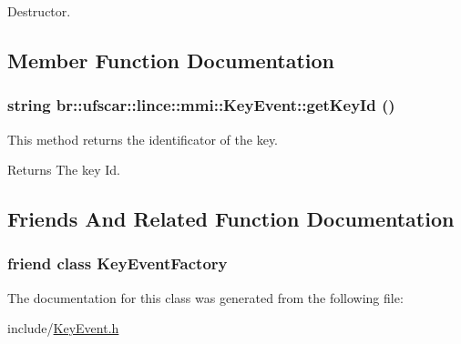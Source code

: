 Destructor. 



\subsection{Member Function Documentation}
\hypertarget{classbr_1_1ufscar_1_1lince_1_1mmi_1_1KeyEvent_a4277d9938693821db5db50942f98fcb5}{
\subsubsection[{getKeyId}]{\setlength{\rightskip}{0pt plus 5cm}string br::ufscar::lince::mmi::KeyEvent::getKeyId ()}}
\label{classbr_1_1ufscar_1_1lince_1_1mmi_1_1KeyEvent_a4277d9938693821db5db50942f98fcb5}


This method returns the identificator of the key. 

\begin{DoxyReturn}{Returns}
The key Id. 
\end{DoxyReturn}


\subsection{Friends And Related Function Documentation}
\hypertarget{classbr_1_1ufscar_1_1lince_1_1mmi_1_1KeyEvent_a2dd856aac914cf1b3eca999c688da31a}{
\subsubsection[{KeyEventFactory}]{\setlength{\rightskip}{0pt plus 5cm}friend class {\bf KeyEventFactory}}}
\label{classbr_1_1ufscar_1_1lince_1_1mmi_1_1KeyEvent_a2dd856aac914cf1b3eca999c688da31a}


The documentation for this class was generated from the following file:\begin{DoxyCompactItemize}
\item 
include/\hyperlink{KeyEvent_8h}{KeyEvent.h}\end{DoxyCompactItemize}
